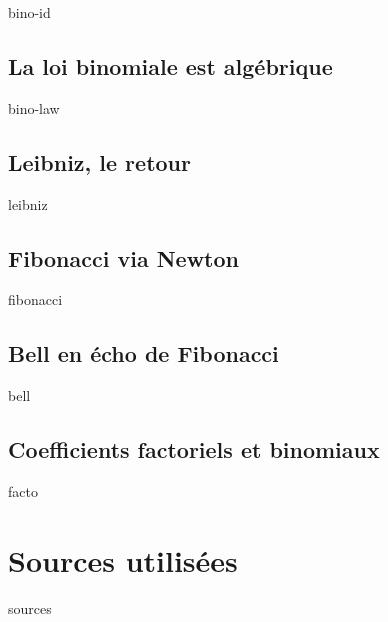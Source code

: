 \documentclass[12pt]{amsart}
\begin{document}
    {bino-id}


    \subsection{La loi binomiale est algébrique}
    
    {bino-law}
    
    
    \subsection{Leibniz, le retour}
    
    {leibniz}
    
    
    \subsection{Fibonacci via Newton}
    
    {fibonacci}
    
    
    \subsection{Bell en écho de Fibonacci} \label{newton-fibo}
    
    {bell}
    
    
    \subsection{Coefficients factoriels et binomiaux}
    
    {facto}




\section{Sources utilisées}

	{sources}
\end{document}
